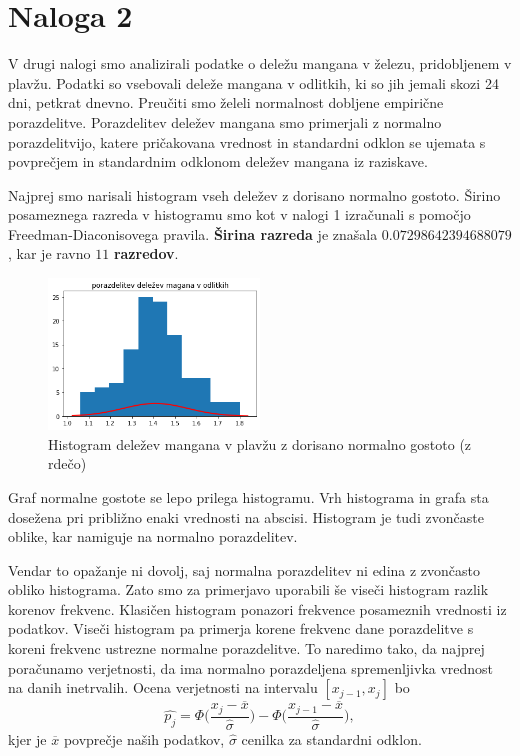 \documentclass{article}
\begin{document}

\section{Naloga 2}

V drugi nalogi smo analizirali podatke o deležu mangana v železu, pridobljenem v plavžu.
Podatki so vsebovali deleže mangana v odlitkih, ki so jih jemali skozi 24 dni, petkrat dnevno.
Preučiti smo želeli normalnost dobljene empirične porazdelitve. Porazdelitev deležev
mangana smo primerjali z normalno porazdelitvijo, katere pričakovana vrednost in standardni odklon
se ujemata s povprečjem in standardnim odklonom deležev mangana iz raziskave.

Najprej smo narisali histogram vseh deležev z dorisano normalno gostoto. Širino posameznega razreda v histogramu 
smo kot v nalogi 1 izračunali s pomočjo Freedman-Diaconisovega pravila. \textbf{Širina razreda} je znašala
$0.07298642394688079$, kar je ravno $11$ \textbf{razredov}.

\begin{figure}[H]
    \begin{center}
        \includegraphics*[width=0.5\textwidth]{figure2A.png}
        \caption{Histogram deležev mangana v plavžu z dorisano normalno gostoto (z rdečo)}
        \label{2A}
    \end{center}
\end{figure}

Graf normalne gostote se lepo prilega histogramu. Vrh histograma in grafa sta dosežena pri 
približno enaki vrednosti na abscisi. Histogram je tudi zvončaste oblike, kar namiguje na normalno porazdelitev.

Vendar to opažanje ni dovolj, saj normalna porazdelitev ni edina z zvončasto obliko histograma.
Zato smo za primerjavo uporabili še viseči histogram razlik korenov frekvenc.
Klasičen histogram ponazori frekvence posameznih vrednosti iz podatkov. 
Viseči histogram pa primerja korene frekvenc dane porazdelitve s koreni frekvenc ustrezne normalne porazdelitve.
To naredimo tako, da najprej poračunamo verjetnosti, da ima normalno porazdeljena spremenljivka 
vrednost na danih inetrvalih. Ocena verjetnosti na intervalu $[x_{j-1}, x_j]$ bo
\begin{equation}
    \hat{p_j} = \Phi \biggl(\frac{x_j - \overline{x}}{\hat{\sigma}}\biggr) - \Phi\biggl(\frac{x_{j-1} - \overline{x}}{\hat{\sigma}}\biggr),
\end{equation}
kjer je $\overline{x}$ povprečje naših podatkov, $\hat{\sigma}$ cenilka za standardni odklon.
\end{document}
